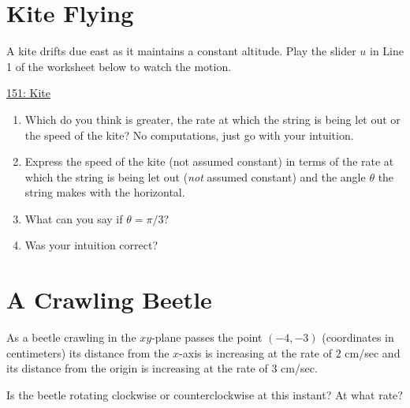\documentclass{ximera}
\begin{document}
\section{Kite Flying}
\begin{question} \label{Q9oigohonn}
A kite drifts due east as it maintains a constant altitude. Play the slider $u$ in Line 1 of the worksheet below to watch the motion.

 
\begin{onlineOnly}
   \begin{center}
\end{center}
\end{onlineOnly}

\href{https://www.desmos.com/calculator/qdrzdt4erc}{151: Kite}

\begin{enumerate}
\item Which do you think is greater, the rate at which the string is being let out or the speed of the kite? No computations, just go with your intuition.

\item Express the speed of the kite (not assumed constant) in terms of the rate at which the string is being let out (\emph{not} assumed constant) and the angle $\theta$ the string makes with the horizontal.

\item What can you say if $\theta =  \pi/3$?

\item Was your intuition correct?
\end{enumerate}
\end{question}


\section{A Crawling Beetle}
\begin{question}  \label{Qbnmkgytyuu}
As a beetle crawling in the $xy$-plane passes the point $(-4,-3)$ (coordinates in centimeters) its distance from the $x$-axis is increasing at the rate of $2$ cm/sec and its distance from the origin is increasing at the rate of $3$ cm/sec.

Is the beetle rotating clockwise or counterclockwise at this instant? At what rate?

\end{question}
\end{document}
